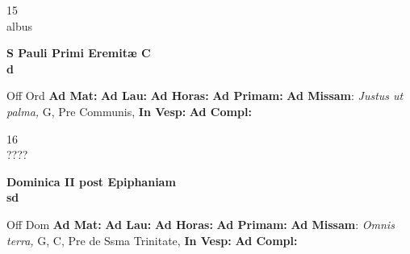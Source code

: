 \documentclass[10pt, openany]{book}
\begin{document}
    \begin{center}
        \begin{minipage}{3.5in}
            \vspace{2em}
            \begin{minipage}{0.5in}
                {\Huge 15} \\
                {\normalsize albus}
            \end{minipage}
            \begin{minipage}{3.0in}
                \textbf{ \large S Pauli Primi Eremitæ C \\
                \textnormal{\normalsize d}}

            \end{minipage}
            \begin{justify}Off Ord
                \textbf{Ad Mat: }
                \textbf{Ad Lau: }
                \textbf{Ad Horas: }
                \textbf{Ad Primam: }\textbf{Ad Missam}: \textit{Justus ut palma,} G, Pre Communis, 
                \textbf{In Vesp: }
                \textbf{Ad Compl: }
            \end{justify}
        \end{minipage}
    \end{center}

    \begin{center}
        \begin{minipage}{3.5in}
            \vspace{2em}
            \begin{minipage}{0.5in}
                {\Huge 16} \\
                {\normalsize ????}
            \end{minipage}
            \begin{minipage}{3.0in}
                \textbf{ \large Dominica II post Epiphaniam \\
                \textnormal{\normalsize sd}}

            \end{minipage}
            \begin{justify}Off Dom
                \textbf{Ad Mat: }
                \textbf{Ad Lau: }
                \textbf{Ad Horas: }
                \textbf{Ad Primam: }\textbf{Ad Missam}: \textit{Omnis terra,} G, C, Pre de Ssma Trinitate, 
                \textbf{In Vesp: }
                \textbf{Ad Compl: }
            \end{justify}
        \end{minipage}
    \end{center}
\end{document}
